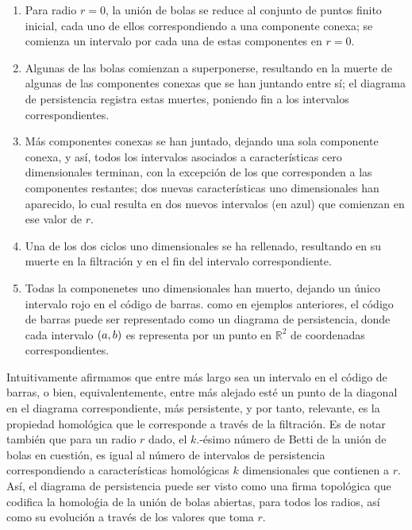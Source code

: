 \begin{enumerate}[label=\alph*)]
    \item Para radio $r=0$, la uni\'on de bolas se reduce al conjunto de puntos finito inicial,
    cada uno de ellos correspondiendo a una componente conexa;
    se comienza un intervalo por cada una de estas componentes en $r=0$.

    \item Algunas de las bolas comienzan a superponerse,
    resultando en la muerte de algunas de las componentes conexas que se han juntando entre s\'i;
    el diagrama de persistencia registra estas muertes, poniendo fin a los intervalos correspondientes.
    
    \item M\'as componentes conexas se han juntado, dejando una sola componente conexa,
    y as\'i, todos los intervalos asociados a caracter\'isticas cero dimensionales terminan,
    con la excepci\'on de los que corresponden a las componentes restantes;
    dos nuevas caracter\'isticas uno dimensionales han aparecido,
    lo cual resulta en dos nuevos intervalos (en azul) que comienzan en ese valor de $r$.
    
    \item Una de los dos ciclos uno dimensionales se ha rellenado,
    resultando en su muerte en la filtraci\'on y en el fin del intervalo correspondiente.
    
    \item Todas la componenetes uno dimensionales han muerto, dejando un \'unico intervalo rojo en el c\'odigo de barras.
    como en ejemplos anteriores, el c\'odigo de barras puede ser representado como un diagrama de persistencia,
    donde cada intervalo $\left(a,b\right)$ es representa por un punto en $\mathbb{R}^{2}$ de coordenadas correspondientes.
    
\end{enumerate}

Intuitivamente afirmamos que entre m\'as largo sea un intervalo en el c\'odigo de barras,
o bien, equivalentemente,
entre m\'as alejado est\'e un punto de la diagonal en el diagrama correspondiente,
m\'as persistente, y por tanto, relevante, es la propiedad homol\'ogica que le corresponde a trav\'es de la filtraci\'on.
Es de notar tambi\'en que para un radio $r$ dado, el $k$.-\'esimo n\'umero de Betti de la uni\'on de bolas en cuesti\'on,
es igual al n\'umero de intervalos de persistencia correspondiendo a caracter\'isticas homol\'ogicas $k$ dimensionales que contienen a $r$.
As\'i, el diagrama de persistencia puede ser visto como una firma topol\'ogica que codifica la homolo\'gia de la uni\'on de bolas abiertas,
para todos los radios, as\'i como su evoluci\'on a trav\'es de los valores que toma $r$.


